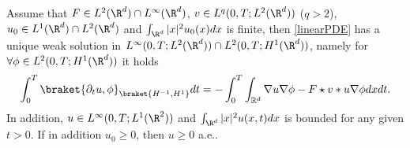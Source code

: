 \begin{theorem}\label{lemLPDE}
	Assume that $F\in L^2(\R^d)\cap L^\infty(\R^d)$, $v \in  L^{q}(0,T;L^{2}(\R^d) )$ ($q>2$), $u_0\in L^1(\R^d)\cap L^2(\R^d)$ and $\int_{\R^d}|x|^2u_0(x)dx$ is finite, then \autoref{linearPDE} has a unique weak solution in $L^\infty(0,T; L^2(\R^d) )\cap L^{2}(0,T; H^{1}(\R^d) )$, namely for $\forall  \phi \in  L^{2}(0,T; H^{1}(\R^d) ) $ it holds
	\begin{align*} 
	\int_0^{T}    \braket{\partial_t u , \phi }_{\braket{H^{-1},H^{1}  }} dt = -\int_0^{T} \int_{\mathbb{R}^{d} }   \nabla u \nabla \phi -F \star v * u \nabla \phi   dx dt
	.\end{align*}
   In addition, $u\in L^\infty(0,T;L^1(\R^2))$ and $\int_{\R^d}|x|^2u(x,t)dx$ is bounded for any given $t>0$.	If in addition $u_{0} \ge  0$, then  $u \ge 0$ a.e..
\end{theorem}
